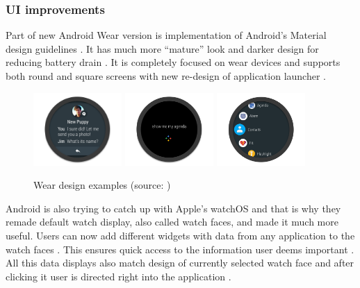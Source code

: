 \subsubsection{UI improvements}\label{sec:UIImprovements}
Part of new Android Wear version is implementation of Android's Material design guidelines \cite{DoAW}. It has much more \enquote{mature} look and darker design for reducing battery drain \cite{AW2WN}. It is completely focused on wear devices and supports both round and square screens with new re-design of application launcher \cite{AW2UG}.

\begin{figure}[H]
	\begin{centering}
		\includegraphics[width=0.3\textwidth]{img/wear_design_notification}
		\includegraphics[width=0.3\textwidth]{img/wear_design_agenda}
		\includegraphics[width=0.3\textwidth]{img/wear_design_menu}
		\par\end{centering}
	\caption{Wear design examples (source: \cite{DoAW})\label{fig:WearDesignExamples}}
	\label{fig03c04}
\end{figure}

Android is also trying to catch up with Apple's watchOS and that is why they remade default watch display, also called watch faces, and made it much more useful. Users can now add different widgets with data from any application to the watch faces \cite{AW2UG}. This ensures quick access to the information user deems important \cite{AW2N}. All this data displays also match design of currently selected watch face and after clicking it user is directed right into the application \cite{AW2WN}.

